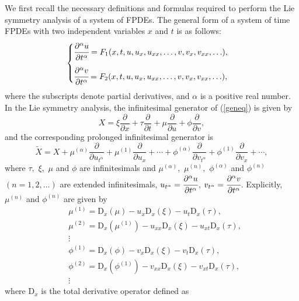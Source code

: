 \documentclass[12pt]{amsart}
\begin{document}
We first recall the necessary definitions and formulas required to perform the Lie symmetry analysis of a system of FPDEs. The general form of a system of time FPDEs with two independent variables $x$ and $t$ is as follows:
\begin{equation}\label{geneq}
\begin{cases}
\cfrac{\partial^\alpha u}{\partial t^\alpha} = F_1(x,t,u,u_x,u_{xx},\ldots, v, v_x, v_{xx},\ldots), \\[10pt]
\cfrac{\partial^\alpha v}{\partial t^\alpha} = F_2(x,t,u,u_x,u_{xx},\ldots, v, v_x, v_{xx},\ldots),
\end{cases}
\end{equation}
where the subscripts denote partial derivatives, and $\alpha$ is a positive real number. In the Lie symmetry analysis, the infinitesimal generator of (\ref{geneq}) is given by
\begin{equation*}
X=\xi\frac{\partial}{\partial x}+\tau\frac{\partial}{\partial t}+\mu\frac{\partial}{\partial u}+\phi\frac{\partial}{\partial v},
\end{equation*}
and the corresponding prolonged infinitesimal generator is
\begin{equation}\label{gener}
\tilde{X}=X+\mu^{(\alpha)}\frac{\partial}{\partial u_{t^{\alpha}}}+\mu^{(1)}\frac{\partial}{\partial u_x}+\cdots
+\phi^{(\alpha)}\frac{\partial}{\partial v_{t^{\alpha}}}+\phi^{(1)}\frac{\partial}{\partial v_x}+\cdots,
\end{equation}
where $\tau,$ $\xi,$ $\mu$ and $\phi$ are infinitesimals and $\mu^{(\alpha)},$ $\mu^{(n)},$ $\phi^{(\alpha)}$ and $\phi^{(n)}$ $(n=1,2,\ldots)$ are extended infinitesimals, $u_{t^\alpha}=\cfrac{\partial^\alpha u}{\partial t^\alpha}$, $v_{t^\alpha}=\cfrac{\partial^\alpha v}{\partial t^\alpha}$. Explicitly, $\mu^{(n)}$ and $\phi^{(n)}$ are given by
\begin{align}\label{mun}
&\mu^{(1)}  =  \mathrm{D}_x(\mu)-u_x\mathrm{D}_x(\xi)-u_t\mathrm{D}_x(\tau), \nonumber\\
&\mu^{(2)}  =  \mathrm{D}_x(\mu^{(1)})-u_{xx}\mathrm{D}_x(\xi)-u_{x t}\mathrm{D}_x(\tau),\nonumber\\
&\vdots  \nonumber\\
&\phi^{(1)} = \mathrm{D}_x(\phi)-v_x\mathrm{D}_x(\xi)-v_t\mathrm{D}_x(\tau),\nonumber\\
&\phi^{(2)} = \mathrm{D}_x(\phi^{(1)})-v_{xx}\mathrm{D}_x(\xi)-v_{x t}\mathrm{D}_x(\tau),\nonumber\\
&\vdots
\end{align}
where $\mathrm{D}_x$ is the total derivative operator defined as
\end{document}

